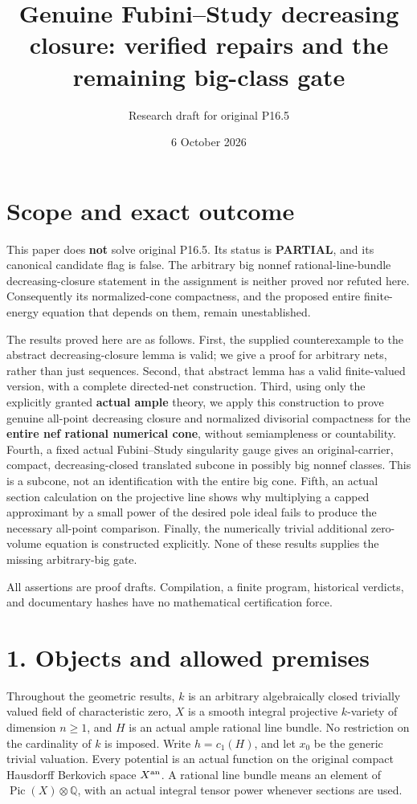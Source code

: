 \documentclass[10pt]{article}
\title{Genuine Fubini--Study decreasing closure: verified repairs and
the remaining big-class gate}
\author{Research draft for original P16.5}
\date{6 October 2026}
\begin{document}
\maketitle
\section{Scope and exact outcome}\label{scope-and-exact-outcome}

This paper does \textbf{not} solve original P16.5. Its status is
\textbf{PARTIAL}, and its canonical candidate flag is false. The
arbitrary big nonnef rational-line-bundle decreasing-closure statement
in the assignment is neither proved nor refuted here. Consequently its
normalized-cone compactness, and the proposed entire finite-energy
equation that depends on them, remain unestablished.

The results proved here are as follows. First, the supplied
counterexample to the abstract decreasing-closure lemma is valid; we
give a proof for arbitrary nets, rather than just sequences. Second,
that abstract lemma has a valid finite-valued version, with a complete
directed-net construction. Third, using only the explicitly granted
\textbf{actual ample} theory, we apply this construction to prove
genuine all-point decreasing closure and normalized divisorial
compactness for the \textbf{entire nef rational numerical cone}, without
semiampleness or countability. Fourth, a fixed actual Fubini--Study
singularity gauge gives an original-carrier, compact, decreasing-closed
translated subcone in possibly big nonnef classes. This is a subcone,
not an identification with the entire big cone. Fifth, an actual section
calculation on the projective line shows why multiplying a capped
approximant by a small power of the desired pole ideal fails to produce
the necessary all-point comparison. Finally, the numerically trivial
additional zero-volume equation is constructed explicitly. None of these
results supplies the missing arbitrary-big gate.

All assertions are proof drafts. Compilation, a finite program,
historical verdicts, and documentary hashes have no mathematical
certification force.

\section{1. Objects and allowed
premises}\label{objects-and-allowed-premises}

Throughout the geometric results, \(k\) is an arbitrary algebraically
closed trivially valued field of characteristic zero, \(X\) is a smooth
integral projective \(k\)-variety of dimension \(n\geq1\), and \(H\) is
an actual ample rational line bundle. No restriction on the cardinality
of \(k\) is imposed. Write \(h=c_1(H)\), and let \(x_0\) be the generic
trivial valuation. Every potential is an actual function on the original
compact Hausdorff Berkovich space \(X^{\rm an}\). A rational line bundle
means an element of \(\operatorname{Pic}(X)\otimes\mathbb Q\), with an
actual integral tensor power whenever sections are used.
\end{document}
